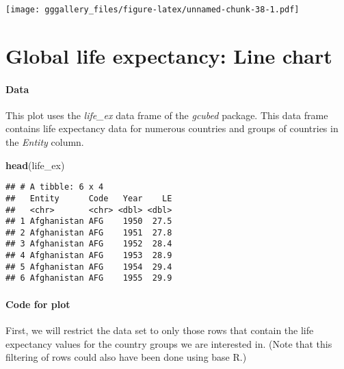 \documentclass[]{book}
\newenvironment{Shaded}{\begin{snugshade}}{\end{snugshade}}
\newcommand{\KeywordTok}[1]{\textcolor[rgb]{0.13,0.29,0.53}{\textbf{#1}}}
\newcommand{\NormalTok}[1]{#1}
\newcommand{\OperatorTok}[1]{\textcolor[rgb]{0.81,0.36,0.00}{\textbf{#1}}}
\newcommand{\StringTok}[1]{\textcolor[rgb]{0.31,0.60,0.02}{#1}}
\begin{document}
\texttt{[image: gggallery\_files/figure-latex/unnamed-chunk-38-1.pdf]}

\hypertarget{lex}{%
\chapter*{Global life expectancy: Line chart}\label{lex}}

\hypertarget{lexdata}{%
\subsubsection*{Data}\label{lexdata}}

This plot uses the \emph{life\_ex} data frame of the \emph{gcubed} package. This data frame contains life expectancy data for numerous countries and groups of countries in the \emph{Entity} column.

\begin{Shaded}
\begin{Highlighting}[]
\KeywordTok{head}\NormalTok{(life_ex)}
\end{Highlighting}
\end{Shaded}

\begin{verbatim}
## # A tibble: 6 x 4
##   Entity      Code   Year    LE
##   <chr>       <chr> <dbl> <dbl>
## 1 Afghanistan AFG    1950  27.5
## 2 Afghanistan AFG    1951  27.8
## 3 Afghanistan AFG    1952  28.4
## 4 Afghanistan AFG    1953  28.9
## 5 Afghanistan AFG    1954  29.4
## 6 Afghanistan AFG    1955  29.9
\end{verbatim}

\hypertarget{lexcode}{%
\subsubsection*{Code for plot}\label{lexcode}}

First, we will restrict the data set to only those rows that contain the life expectancy values for the country groups we are interested in. (Note that this filtering of rows could also have been done using base R.)

\begin{Shaded}
\end{Shaded}
\end{document}
